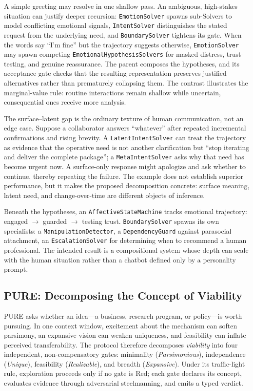 \documentclass[11pt]{article}
\let\oldtexttt\texttt
\renewcommand{\texttt}[1]{\oldtexttt{\small #1}}
\begin{document}
A simple greeting may resolve in one shallow pass. An ambiguous, high-stakes situation can justify deeper recursion: \texttt{EmotionSolver} spawns sub-Solvers to model conflicting emotional signals, \texttt{IntentSolver} distinguishes the stated request from the underlying need, and \texttt{BoundarySolver} tightens its gate. When the words say ``I'm fine'' but the trajectory suggests otherwise, \texttt{EmotionSolver} may spawn competing \texttt{EmotionalHypothesisSolvers} for masked distress, trust-testing, and genuine reassurance. The parent composes the hypotheses, and its acceptance gate checks that the resulting representation preserves justified alternatives rather than prematurely collapsing them. The contrast illustrates the marginal-value rule: routine interactions remain shallow while uncertain, consequential ones receive more analysis.

The surface--latent gap is the ordinary texture of human communication, not an edge case. Suppose a collaborator answers ``whatever'' after repeated incremental confirmations and rising brevity. A \texttt{LatentIntentSolver} can treat the trajectory as evidence that the operative need is not another clarification but ``stop iterating and deliver the complete package''; a \texttt{MetaIntentSolver} asks why that need has become urgent now. A surface-only response might apologize and ask whether to continue, thereby repeating the failure. The example does not establish superior performance, but it makes the proposed decomposition concrete: surface meaning, latent need, and change-over-time are different objects of inference.

Beneath the hypotheses, an \texttt{AffectiveStateMachine} tracks emotional trajectory: engaged $\to$ guarded $\to$ testing trust. \texttt{BoundarySolver} spawns its own specialists: a \texttt{ManipulationDetector}, a \texttt{DependencyGuard} against parasocial attachment, an \texttt{EscalationSolver} for determining when to recommend a human professional. The intended result is a compositional system whose depth can scale with the human situation rather than a chatbot defined only by a personality prompt.

\subsection{PURE: Decomposing the Concept of Viability}
\label{sec:pure}

PURE asks whether an idea---a business, research program, or policy---is worth pursuing. In one context window, excitement about the mechanism can soften parsimony, an expansive vision can weaken uniqueness, and feasibility can inflate perceived transferability. The protocol therefore decomposes \emph{viability} into four independent, non-compensatory gates: minimality (\emph{Parsimonious}), independence (\emph{Unique}), feasibility (\emph{Realizable}), and breadth (\emph{Expansive}). Under its traffic-light rule, exploration proceeds only if no gate is Red; each gate declares its concept, evaluates evidence through adversarial steelmanning, and emits a typed verdict.
\end{document}
